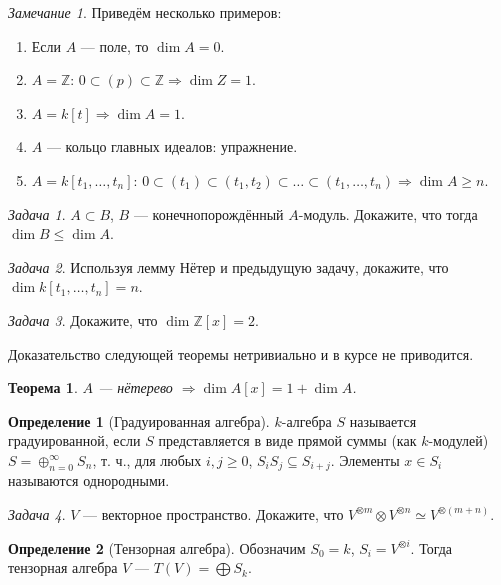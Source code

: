 \documentclass{article}
\newtheorem*{theorem}{Теорема}
\theoremstyle{definition}
\newtheorem*{definition}{Определение}
\theoremstyle{remark}
\newtheorem*{remark}{Замечание}
\newtheorem{prb}{Задача}
\newenvironment{problem}
{\begin{prb}
\label{\theprb}}
{\end{prb}}
\newcommand{\Ra}{\Rightarrow}
\newcommand{\Z}{\mathbb{Z}}
\begin{document}
\begin{remark}
    Приведём несколько примеров:
    \begin{enumerate}
        \item Если $A$ --- поле, то $\dim A = 0$.
        \item $A = \Z$: $0 \subset (p) \subset \Z \Ra \dim Z = 1$.
        \item $A = k[t] \Ra \dim A = 1$.
        \item $A$ --- кольцо главных идеалов: упражнение.
        \item $A = k[t_1, \hdots, t_n]$: $0 \subset (t_1) \subset (t_1, t_2) \subset \hdots \subset (t_1, \hdots, t_n) \Ra \dim A \geq n$.
    \end{enumerate}
\end{remark}

\begin{problem}
    $A \subset B$, $B$ --- конечнопорождённый $A$-модуль. Докажите, что тогда $\dim B \leq \dim A$.
\end{problem}
\begin{problem}
    Используя лемму Нётер и предыдущую задачу, докажите, что $\dim k[t_1, \hdots, t_n] = n$.
\end{problem}
\begin{problem}
    Докажите, что $\dim \Z[x] = 2$.
\end{problem}

Доказательство следующей теоремы нетривиально и в курсе не приводится.
\begin{theorem}
    $A$ --- нётерево $\Ra \dim A[x] = 1 + \dim A$.
\end{theorem}

\begin{definition}[Градуированная алгебра]
	$k$-алгебра $S$ называется градуированной, если $S$ представляется в виде прямой суммы (как $k$-модулей) $S = \oplus_{n = 0}^\infty S_n$, т. ч., для любых $i, j \ge 0$, $S_i S_j \subseteq S_{i + j}$. Элементы $x \in S_i$ называются однородными.
\end{definition}

\begin{problem}
    $V$ --- векторное пространство. Докажите, что $V^{\otimes m} \otimes V^{\otimes n} \simeq V^{\otimes (m + n)}$.
\end{problem}

\begin{definition}[Тензорная алгебра]
    Обозначим $S_0 = k$, $S_i = V^{\otimes i}$. Тогда тензорная алгебра $V$ --- $T(V) = \bigoplus S_k$.
\end{definition}
\end{document}
